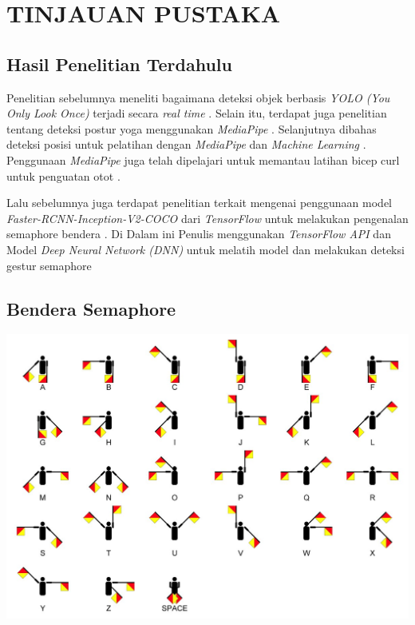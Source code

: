 \chapter{TINJAUAN PUSTAKA}

\section{Hasil Penelitian Terdahulu}
Penelitian sebelumnya meneliti bagaimana deteksi objek berbasis \textit{YOLO (You Only Look Once)} terjadi secara \textit{real time} \cite{redmon2016you}. Selain itu, terdapat juga penelitian tentang deteksi postur yoga menggunakan \textit{MediaPipe} \cite{garg2022yoga}. Selanjutnya dibahas deteksi posisi untuk pelatihan dengan \textit{MediaPipe} dan \textit{Machine Learning} \cite{supanich2023machine}. Penggunaan \textit{MediaPipe} juga telah dipelajari untuk memantau latihan bicep curl untuk penguatan otot \cite{nguyen2023assessing}.

  Lalu sebelumnya juga terdapat penelitian terkait mengenai penggunaan model \textit{Faster-RCNN-Inception-V2-COCO} dari \textit{TensorFlow} untuk melakukan pengenalan semaphore bendera . Di Dalam ini Penulis menggunakan \textit{TensorFlow API} dan Model \textit{Deep Neural Network (DNN)} untuk melatih model dan melakukan deteksi gestur semaphore \cite{motty2023flag}


\section{Bendera Semaphore}

\begin{center}
	\includegraphics[width=0.9\linewidth]{gambar/bener/Semaphore-Pose.jpg}
	\label{fig:BenderaSemaphore}
\end{center}

